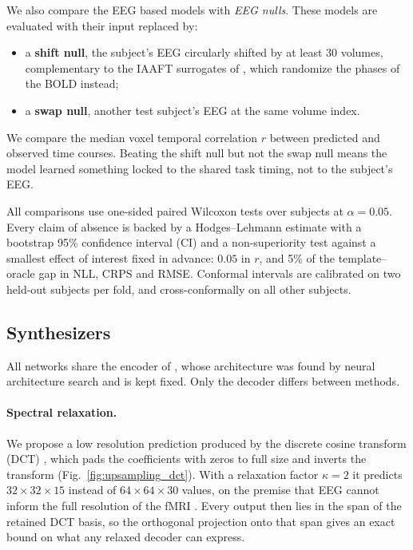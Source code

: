 We also compare the EEG based models with \emph{EEG nulls}. These models are evaluated with their input replaced by:
\begin{itemize}
	\item a \textbf{shift null}, the subject's EEG circularly shifted by at least 30 volumes, complementary to the IAAFT surrogates of \citet{mehta2025eegbold}, which randomize the phases of the BOLD instead;
	\item a \textbf{swap null}, another test subject's EEG at the same volume index.
\end{itemize}
We compare the median voxel temporal correlation $r$ between predicted and observed time courses. Beating the shift null but not the swap null means the model learned something locked to the shared task timing, not to the subject's EEG.

All comparisons use one-sided paired Wilcoxon tests over subjects at $\alpha=0.05$. Every claim of absence is backed by a Hodges--Lehmann estimate with a bootstrap 95\% confidence interval (CI) and a non-superiority test against a smallest effect of interest fixed in advance: $0.05$ in $r$, and 5\% of the template--oracle gap in NLL, CRPS and RMSE. Conformal intervals are calibrated on two held-out subjects per fold, and cross-conformally on all other subjects.

\subsection{Synthesizers}\label{sec:methods}
All networks share the encoder of \citet{calhas2022eeg}, whose architecture was found by neural architecture search \citep{calhas2021automatic} and is kept fixed. Only the decoder differs between methods.

\paragraph{Spectral relaxation.} We propose a low resolution prediction produced by the discrete cosine transform (DCT) \citep{ahmed1974discrete}, which pads the coefficients with zeros to full size and inverts the transform (Fig.~\ref{fig:upsampling_dct}). With a relaxation factor $\kappa=2$ it predicts $32\times32\times15$ instead of $64\times64\times30$ values, on the premise that EEG cannot inform the full resolution of the fMRI \citep{burle2015spatial}. Every output then lies in the span of the retained DCT basis, so the orthogonal projection onto that span gives an exact bound on what any relaxed decoder can express.

